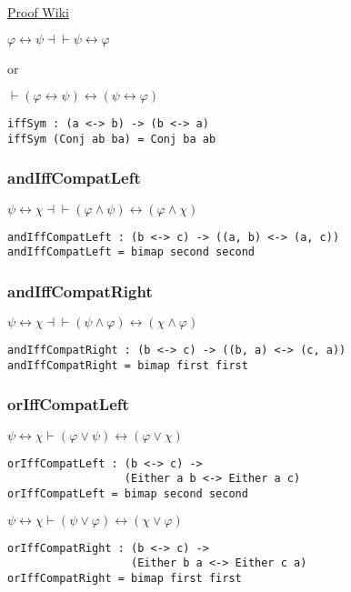 \documentclass{acm_proc_article-sp}
\renewcommand{\iff}{\leftrightarrow}
\begin{document}
\href{https://proofwiki.org/wiki/Biconditional_is_Commutative}{Proof Wiki}

\(\varphi \iff \psi \dashv\vdash \psi \iff \varphi\)

or

\(\vdash (\varphi \iff \psi) \iff (\psi \iff \varphi)\)

\begin{verbatim}
iffSym : (a <-> b) -> (b <-> a)
iffSym (Conj ab ba) = Conj ba ab
\end{verbatim}

\subsubsection{andIffCompatLeft}\label{andiffcompatleft}

\(\psi \iff \chi \dashv\vdash (\varphi \land \psi) \iff (\varphi \land \chi)\)

\begin{verbatim}
andIffCompatLeft : (b <-> c) -> ((a, b) <-> (a, c))
andIffCompatLeft = bimap second second
\end{verbatim}

\subsubsection{andIffCompatRight}\label{andiffcompatright}

\(\psi \iff \chi \dashv\vdash (\psi \land \varphi) \iff (\chi \land \varphi)\)

\begin{verbatim}
andIffCompatRight : (b <-> c) -> ((b, a) <-> (c, a))
andIffCompatRight = bimap first first
\end{verbatim}

\subsubsection{orIffCompatLeft}\label{oriffcompatleft}

\(\psi \iff \chi \vdash (\varphi \lor \psi) \iff (\varphi \lor \chi)\)

\begin{verbatim}
orIffCompatLeft : (b <-> c) ->
                  (Either a b <-> Either a c)
orIffCompatLeft = bimap second second
\end{verbatim}

\(\psi \iff \chi \vdash (\psi \lor \varphi) \iff (\chi \lor \varphi)\)

\begin{verbatim}
orIffCompatRight : (b <-> c) ->
                   (Either b a <-> Either c a)
orIffCompatRight = bimap first first
\end{verbatim}
\end{document}
